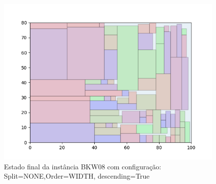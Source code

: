 \begin{figure}[H]
    \centering
    \caption[]{Estado final da instância BKW08 com configuração: Split=NONE,Order=WIDTH, descending=True}
    \label{fig:bkw08-none-width-true}
    \includegraphics[scale=0.5]{output/figures/bkw/bkw08/none/width/true/00}
\end{figure}